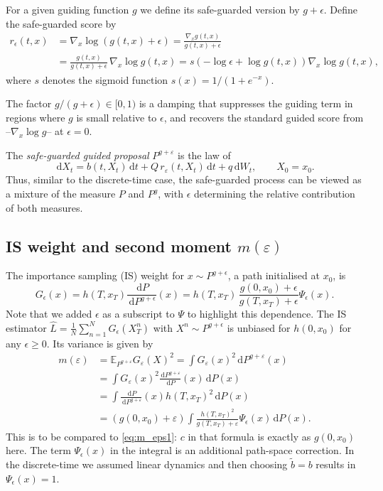 \documentclass[11pt,reqno]{amsart}
\newcommand{\dd}{{\,\mathrm d}}
\newcommand{\eps}{\varepsilon}
\newcommand{\EE}{\mathbb{E}}
\theoremstyle{definition}
\begin{document}
For a given guiding function $g$ we define its safe-guarded version by $g+\epsilon$. Define the safe-guarded score by 
\begin{align*}
  r_\epsilon(t,x) &= \nabla_x \log(g(t,x)+\epsilon)
  = \frac{\nabla_x g(t,x)}{g(t,x)+\epsilon} \\& 
  = \frac{g(t,x)}{g(t,x)+\epsilon}\,\nabla_x \log g(t,x)=s(-\log \epsilon +\log g(t,x)) \nabla_x \log g(t,x),
 \end{align*} 
where $s$ denotes the sigmoid function  $s(x)=1/(1+e^{-x})$.


The factor $g/(g+\epsilon)\in[0,1)$ is a  damping that suppresses
the guiding term in regions where $g$ is small relative to $\epsilon$,
and recovers the standard guided score from \cite{schauer2017guided} --$\nabla_x\log g$-- at $\epsilon=0$.

The \emph{safe-guarded guided proposal} $P^{g+\varepsilon}$ is the law of
\begin{equation}\label{eq:guided_SDE}
  \dd X_t = b(t,X_t) \dd t + Q\,r_\varepsilon(t,X_t) \dd t + q \dd W_t,
  \qquad X_0 = x_0.
\end{equation}
 Thus, similar to the discrete-time case, the safe-guarded  process can be viewed as a mixture of the measure $P$ and $P^{g}$, with $\epsilon$ determining the relative contribution of both measures. 

\subsection{IS weight and second moment $m(\varepsilon)$}
The importance sampling (IS) weight for   $x\sim P^{g+\epsilon}$, a path initialised at $x_0$, is
\[
  G_\epsilon(x) = h(T,x_T) \frac{\dd P}{\dd P^{g+\epsilon}}(x)= h(T, x_T)\,\frac{g(0,x_0)+\epsilon}{g(T,x_T)+\epsilon}
\Psi_\epsilon(x).
\]
Note that we added $\epsilon$ as a subscript to $\Psi$ to highlight this dependence. 
The IS estimator $\hat L = \frac{1}{N}\sum_{n=1}^N G_\epsilon(X^n_T)$
with $X^n \sim P^{g+\epsilon}$ is unbiased for $h(0,x_0)$ for any
$\epsilon\geq 0$. Its variance is given by \begin{equation}\begin{split}\label{eq:meps_cont} m(\eps) &= \EE_{P^{g+\eps}} G_\eps(X)^2 = \int  G_\eps(x)^2 \dd P^{g+\eps}(x) \\ & = \int  G_\eps(x)^2 \frac{\dd P^{g+\eps}}{\dd P}(x) \dd P(x) \\ & = \int \frac{\dd P}{\dd P^{g+\eps}}(x) h(T, x_T)^2 \dd P(x) \\ & =(g(0, x_0)+\eps) \int \frac{h(T,x_T)^2}{g(T, x_T)+\eps}  \Psi_\epsilon(x) \dd P(x) .
\end{split}
\end{equation}
This is to be compared to \eqref{eq:m_eps1}: $c$ in that formula is exactly as $g(0, x_0)$ here. The term $\Psi_\epsilon(x)$ in the integral is an additional path-space correction.  In the discrete-time we assumed linear dynamics and then   choosing  $\tilde b=b$ results in  $\Psi_\epsilon(x)=1$.
\end{document}
